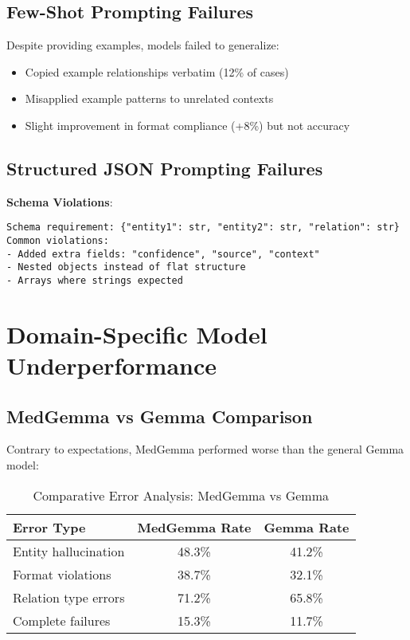 \subsection{Few-Shot Prompting Failures}

Despite providing examples, models failed to generalize:
\begin{itemize}
    \item Copied example relationships verbatim (12\% of cases)
    \item Misapplied example patterns to unrelated contexts
    \item Slight improvement in format compliance (+8\%) but not accuracy
\end{itemize}

\subsection{Structured JSON Prompting Failures}

\textbf{Schema Violations}:
\begin{verbatim}
Schema requirement: {"entity1": str, "entity2": str, "relation": str}
Common violations:
- Added extra fields: "confidence", "source", "context"
- Nested objects instead of flat structure
- Arrays where strings expected
\end{verbatim}

\section{Domain-Specific Model Underperformance}

\subsection{MedGemma vs Gemma Comparison}

Contrary to expectations, MedGemma performed worse than the general Gemma model:

\begin{table}[htbp]
\centering
\caption{Comparative Error Analysis: MedGemma vs Gemma}
\label{tab:medgemma-errors}
\begin{tabular}{lcc}
\toprule
\textbf{Error Type} & \textbf{MedGemma Rate} & \textbf{Gemma Rate} \\
\midrule
Entity hallucination & 48.3\% & 41.2\% \\
Format violations & 38.7\% & 32.1\% \\
Relation type errors & 71.2\% & 65.8\% \\
Complete failures & 15.3\% & 11.7\% \\
\bottomrule
\end{tabular}
\end{table}

